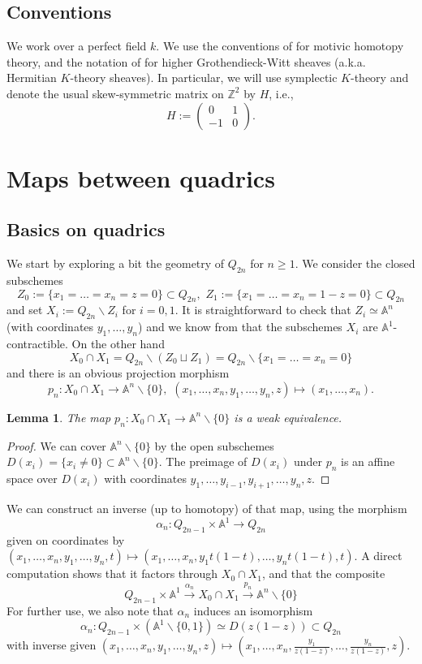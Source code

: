 \documentclass[11pt,leqno]{article}
\newcommand{\Z}{{\mathbb Z}}
\newcommand{\A}{{\mathbb A}}
\renewcommand{\1}{{\rm 1\hspace*{-0.4ex}%
\rule{0.1ex}{1.52ex}\hspace*{0.2ex}}}
\newcommand{\<}[1]{{\langle}#1 {\rangle}}
\theoremstyle{plain}
\newtheorem{lem}[thm]{Lemma}
\theoremstyle{definition}
\theoremstyle{remark}
\numberwithin{equation}{section}
\begin{document}
\subsection*{Conventions}
We work over a perfect field $k$. We use the conventions of \cite{Asok20b} for motivic homotopy theory, and the notation of \cite[\S 3]{Asok12c} for higher Grothendieck-Witt sheaves (a.k.a. Hermitian $K$-theory sheaves). In particular, we will use symplectic $K$-theory and denote the usual skew-symmetric matrix on $\Z^2$ by $H$, i.e.,
\[
H := \begin{pmatrix}
    0 & 1 \\ -1 & 0
\end{pmatrix}.
\]

\section{Maps between quadrics}

\subsection{Basics on quadrics}\label{sec:basicsquadrics}

We start by exploring a bit the geometry of $Q_{2n}$ for $n\geq 1$. We consider the closed subschemes 
\[
Z_0:=\{x_1=\ldots=x_n=z=0\}\subset Q_{2n}, \phantom{i}Z_1:=\{x_1=\ldots=x_n=1-z=0\}\subset Q_{2n}
\]
and set $X_i:=Q_{2n}\smallsetminus Z_i$ for $i=0,1$. It is straightforward to check that $Z_i\simeq \A^n$ (with coordinates $y_1,\ldots,y_n$) and we know from \cite[Theorem 3.1.1]{Asok14} that the subschemes $X_i$ are $\A^1$-contractible. On the other hand
\[
X_0\cap X_1=Q_{2n}\smallsetminus (Z_0\sqcup Z_1)=Q_{2n}\smallsetminus \{x_1=\ldots=x_n=0\}
\]
and there is an obvious projection morphism 
\[
p_n\colon X_0\cap X_1\to \A^n\smallsetminus \{0\},\phantom{i}(x_1,\ldots,x_n,y_1,\ldots,y_n,z)\mapsto (x_1,\ldots,x_n).
\]
\begin{lem}
The map $p_n\colon  X_0\cap X_1\to \A^n\smallsetminus \{0\}$ is a weak equivalence. 
\end{lem}

\begin{proof}
We can cover $\A^n\smallsetminus\{0\}$ by the open subschemes $D(x_i)=\{x_i\neq 0\}\subset \A^n\smallsetminus\{0\}$. The preimage of $D(x_i)$ under $p_n$ is an affine space over $D(x_i)$ with coordinates $y_1,\ldots,y_{i-1},y_{i+1},\ldots,y_n,z$. 
\end{proof}

We can construct an inverse (up to homotopy) of that map, using the morphism
\[
\alpha_n\colon Q_{2n-1}\times \A^1\to Q_{2n}
\]
given on coordinates by $(x_1,\ldots,x_n,y_1,\ldots,y_n,t)\mapsto (x_1,\ldots,x_n,y_1t(1-t),\ldots,y_nt(1-t),t)$. A direct computation shows that it factors through $X_0\cap X_1$, and that the composite 
\[
Q_{2n-1}\times \A^1\xrightarrow{\alpha_n} X_0\cap X_1\xrightarrow{p_n} \A^n\smallsetminus \{0\}
\]
For further use, we also note that $\alpha_n$ induces an isomorphism 
\[
\alpha_n\colon Q_{2n-1}\times (\A^1\smallsetminus \{0,1\})\simeq D(z(1-z))\subset Q_{2n}
\]
with inverse given $(x_1,\ldots,x_n,y_1,\ldots,y_n,z)\mapsto (x_1,\ldots,x_n,\frac {y_1}{z(1-z)},\ldots,\frac {y_n}{z(1-z)},z)$. 
\end{document}

